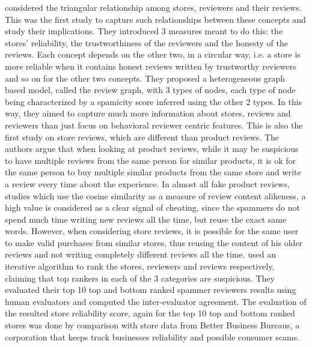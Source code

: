 \citet{Wang2012} considered the triangular relationship among stores, reviewers and their reviews. This was the first study to capture such relationships between these concepts and study their implications. They introduced 3 measures meant to do this: the stores’ reliability, the trustworthiness of the reviewers and the honesty of the reviews. Each concept depends on the other two, in a circular way, i.e. a store is more reliable when it contains honest reviews written by trustworthy reviewers and so on for the other two concepts. They proposed a heterogeneous graph based model, called the review graph, with 3 types of nodes, each type of node being characterized by a spamicity score inferred using the other 2 types. In this way, they aimed to capture much more information about stores, reviews and reviewers than just focus on behavioral reviewer centric features. This is also the first study on store reviews, which are different than product reviews. The authors argue that when looking at product reviews, while it may be suspicious to have multiple reviews from the same person for similar products, it is ok for the same person to buy multiple similar products from the same store and write a review every time about the experience. In almost all fake product reviews, studies which use the cosine similarity as a measure of review content alikeness, a high value is considered as a clear signal of cheating, since the spammers do not spend much time writing new reviews all the time, but reuse the exact same words. However, when considering store reviews, it is possible for the same user to make valid purchases from similar stores, thus reusing the content of his older reviews and not writing completely different reviews all the time. \citet{Wang2012} used an iterative algorithm to rank the stores, reviewers and reviews respectively, claiming that top rankers in each of the 3 categories are suspicious. They evaluated their top 10 top and bottom ranked spammer reviewers results using human evaluators and computed the inter-evaluator agreement. The evaluation of the resulted store reliability score, again for the top 10 top and bottom ranked stores was done by comparison with store data from Better Business Bureaus, a corporation that keeps track businesses reliability and possible consumer scams. 

